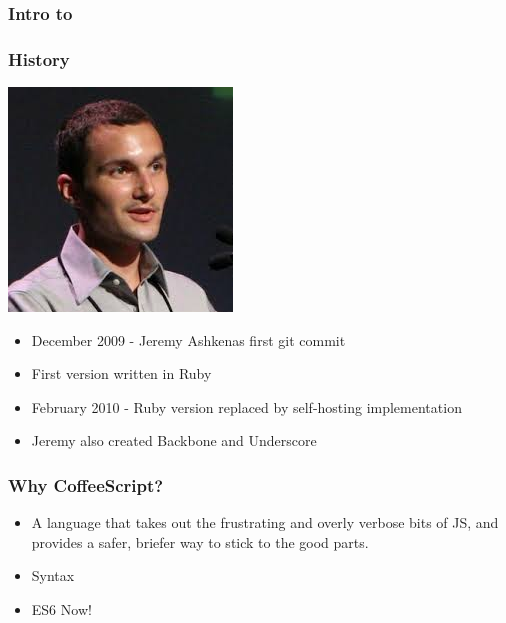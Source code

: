 \documentclass{beamer}
\begin{document}
\begin{frame}
  \frametitle{Intro to}


\end{frame}

\begin{frame}
  \frametitle{History}
  \includegraphics[scale=.60]{jeremy}  
  \begin{itemize}
    \item December 2009 - Jeremy Ashkenas first git commit
      \pause
    \item First version written in Ruby
      \pause
    \item February 2010 - Ruby version replaced by self-hosting
      implementation
      \pause
    \item Jeremy also created Backbone and Underscore
  \end{itemize}  
\end{frame}

\begin{frame}
  \frametitle{Why CoffeeScript?}
  \begin{itemize}
    \pause
    \item A language that takes out the frustrating and overly verbose bits of JS, and provides a safer, briefer way to stick to the good parts.
      \pause
    \item Syntax
    \pause
    \item ES6 Now! 
  \end{itemize}
\end{frame}
\end{document}

